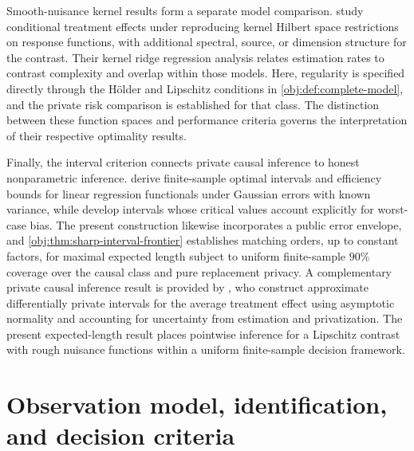 \documentclass[11pt]{article}
\begin{document}
Smooth-nuisance kernel results form a separate model comparison. \citet[][Sections 2, 5, and 6]{Kim2026} study conditional treatment effects under reproducing kernel Hilbert space restrictions on response functions, with additional spectral, source, or dimension structure for the contrast. Their kernel ridge regression analysis relates estimation rates to contrast complexity and overlap within those models. Here, regularity is specified directly through the H\"older and Lipschitz conditions in \cref{obj:def:complete-model}, and the private risk comparison is established for that class. The distinction between these function spaces and performance criteria governs the interpretation of their respective optimality results.

Finally, the interval criterion connects private causal inference to honest nonparametric inference. \citet{ArmstrongKolesar2018} derive finite-sample optimal intervals and efficiency bounds for linear regression functionals under Gaussian errors with known variance, while \citet{ArmstrongKolesar2020} develop intervals whose critical values account explicitly for worst-case bias. The present construction likewise incorporates a public error envelope, and \cref{obj:thm:sharp-interval-frontier} establishes matching orders, up to constant factors, for maximal expected length subject to uniform finite-sample \(90\%\) coverage over the causal class and pure replacement privacy. A complementary private causal inference result is provided by \citet[][Sections 4.2--4.3]{SchroderHartensteinFeuerriegel2025}, who construct approximate differentially private intervals for the average treatment effect using asymptotic normality and accounting for uncertainty from estimation and privatization. The present expected-length result places pointwise inference for a Lipschitz contrast with rough nuisance functions within a uniform finite-sample decision framework.


\section{Observation model, identification, and decision criteria}
\end{document}
